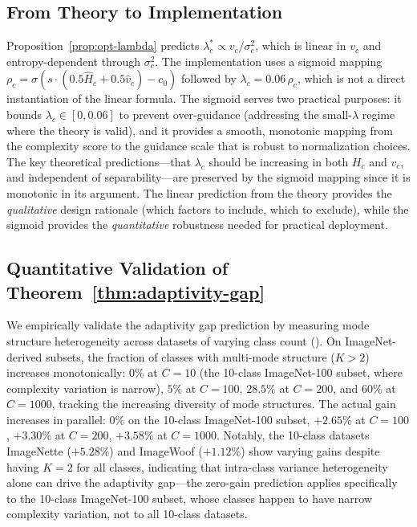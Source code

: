 \subsection{From Theory to Implementation}
\label{sec:theory-impl}
Proposition~\ref{prop:opt-lambda} predicts $\lambda_c^* \propto v_c / \sigma_c^2$, which is linear in $v_c$ and entropy-dependent through $\sigma_c^2$. The implementation uses a sigmoid mapping $\rho_c = \sigma(s \cdot (0.5\hat{H}_c + 0.5\hat{v}_c) - c_0)$ followed by $\lambda_c = 0.06\,\rho_c$, which is not a direct instantiation of the linear formula. The sigmoid serves two practical purposes: it bounds $\lambda_c \in [0, 0.06]$ to prevent over-guidance (addressing the small-$\lambda$ regime where the theory is valid), and it provides a smooth, monotonic mapping from the complexity score to the guidance scale that is robust to normalization choices. The key theoretical predictions---that $\lambda_c$ should be increasing in both $H_c$ and $v_c$, and independent of separability---are preserved by the sigmoid mapping since it is monotonic in its argument. The linear prediction from the theory provides the \emph{qualitative} design rationale (which factors to include, which to exclude), while the sigmoid provides the \emph{quantitative} robustness needed for practical deployment.

\subsection{Quantitative Validation of Theorem~\ref{thm:adaptivity-gap}}
We empirically validate the adaptivity gap prediction by measuring mode structure heterogeneity across datasets of varying class count (). On ImageNet-derived subsets, the fraction of classes with multi-mode structure ($K > 2$) increases monotonically: $0\%$ at $C{=}10$ (the 10-class ImageNet-100 subset, where complexity variation is narrow), $5\%$ at $C{=}100$, $28.5\%$ at $C{=}200$, and $60\%$ at $C{=}1000$, tracking the increasing diversity of mode structures. The actual \cags{} gain increases in parallel: $0\%$ on the 10-class ImageNet-100 subset, $+2.65\%$ at $C{=}100$, $+3.30\%$ at $C{=}200$, $+3.58\%$ at $C{=}1000$. Notably, the 10-class datasets ImageNette ($+5.28\%$) and ImageWoof ($+1.12\%$) show varying gains despite having $K{=}2$ for all classes, indicating that intra-class variance heterogeneity alone can drive the adaptivity gap---the zero-gain prediction applies specifically to the 10-class ImageNet-100 subset, whose classes happen to have narrow complexity variation, not to all 10-class datasets.

